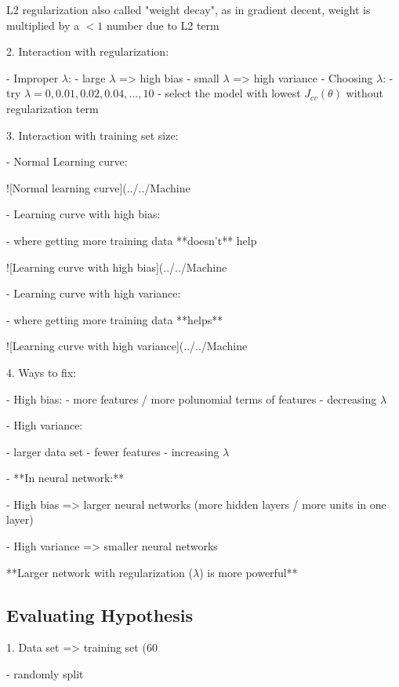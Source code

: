L2 regularization also called "weight decay", as in gradient decent, weight is multiplied by a $<1$ number due to L2 term 

2. Interaction with regularization:

- Improper $\lambda$:
- large $\lambda$ => high bias
- small $\lambda$ => high variance
- Choosing $\lambda$:
- try $\lambda=0,0.01,0.02,0.04,...,10$
- select the model with lowest $J_{cv}(\theta)$ without regularization term

3. Interaction with training set size:

- Normal Learning curve:

![Normal learning curve](../../Machine%

- Learning curve with high bias:

- where getting more training data **doesn't** help

![Learning curve with high bias](../../Machine%

- Learning curve with high variance:

- where getting more training data **helps**

![Learning curve with high variance](../../Machine%

4. Ways to fix:

- High bias:
- more features / more polunomial terms of features
- decreasing $\lambda$

- High variance:

- larger data set
- fewer features
- increasing $\lambda$

- **In neural network:**

- High bias => larger neural networks (more hidden layers / more units in one layer)

- High variance => smaller neural networks

**Larger network with regularization ($\lambda$) is more powerful**

\subsection{Evaluating Hypothesis}

1. Data set => training set (60%

- randomly split

